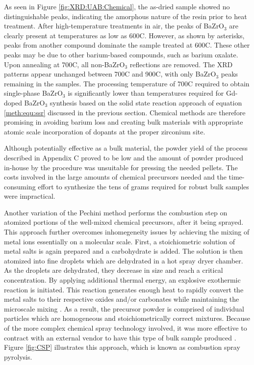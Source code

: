 As seen in Figure \ref{fig:XRD:UAB:Chemical}, the as-dried sample showed no distinguishable peaks, indicating the amorphous nature of the resin prior to heat treatment. After high-temperature treatments in air, the peaks of BaZrO$_3$ are clearly present at temperatures as low as 600\textdegree C. However, as shown by asterisks, peaks from another compound dominate the sample treated at 600\textdegree C. These other peaks may be due to other barium-based compounds, such as barium oxalate. Upon annealing at 700\textdegree C, all non-BaZrO$_3$ reflections are removed. The XRD patterns appear unchanged between 700\textdegree C and 900\textdegree C, with only BaZrO$_3$ peaks remaining in the samples. The processing temperature of 700\textdegree C required to obtain single-phase BaZrO$_3$ is significantly lower than temperatures required for Gd-doped BaZrO$_3$ synthesis based on the solid state reaction approach of equation \ref{meth:equ:ssr} discussed in the previous section. Chemical methods are therefore promising in avoiding barium loss and creating bulk materials with appropriate atomic scale incorporation of dopants at the proper zirconium site.

Although potentially effective as a bulk material, the powder yield of the process described in Appendix C proved to be low and the amount of powder produced in-house by the procedure was unsuitable for pressing the needed pellets. The costs involved in the large amounts of chemical precursors needed and the time-consuming effort to synthesize the tens of grams required for robust bulk samples were impractical. 

Another variation of the Pechini method performs the combustion step on atomized portions of the well-mixed chemical precursors, after it being sprayed. This approach further overcomes inhomegeneity issues by achieving the mixing of metal ions essentially on a molecular scale. First, a stoichiometric solution of metal salts is again prepared and a carbohydrate is added. The solution is then atomized into fine droplets which are dehydrated in a hot spray dryer chamber. As the droplets are dehydrated, they decrease in size and reach a critical concentration. By applying additional thermal energy, an explosive exothermic reaction is initiated. This reaction generates enough heat to rapidly convert the metal salts to their respective oxides and/or carbonates while maintaining the microscale mixing \cite{Praxair2019}. As a result, the precursor powder is comprised of individual particles which are homogeneous and stoichiometrically correct mixtures. Because of the more complex chemical spray technology involved, it was more effective to contract with an external vendor to have this type of bulk sample produced \cite{Praxair2019}. Figure \ref{fig:CSP} illustrates this approach, which is known as combustion spray pyrolysis. 

